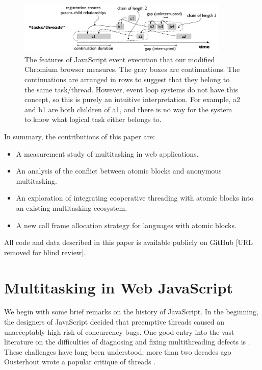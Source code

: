 \documentclass[acmsmall,anonymous,review]{acmart}\settopmatter{printfolios=true,printccs=false,printacmref=false}
\begin{document}
\begin{figure}
\includegraphics[width=0.9\textwidth]{Figures/continuation_tree}
\caption{The features of JavaScript event execution that our modified Chromium browser measures.
  The gray boxes are continuations.
  The continuations are arranged in rows to suggest that they belong to the same task/thread.
  However, event loop systems do not have this concept, so this is purely an intuitive interpretation.
  For example, a2 and b1 are both children of a1, and there is no way for the system to know what logical task either belongs to.}
\label{fig:continuation_tree}
\end{figure}

In summary, the contributions of this paper are:
\begin{itemize}
\item A measurement study of multitasking in web applications.
\item An analysis of the conflict between atomic blocks and anonymous multitasking.
\item An exploration of integrating cooperative threading with atomic blocks into an existing multitasking ecosystem.
\item A new call frame allocation strategy for languages with atomic blocks.
\end{itemize}

All code and data described in this paper is available publicly on GitHub [URL removed for blind review].

\section{Multitasking in Web JavaScript}

We begin with some brief remarks on the history of JavaScript.
In the beginning, the designers of JavaScript decided that preemptive threads caused an unacceptably high risk of concurrency bugs.
One good entry into the vast literature on the difficulties of diagnosing and fixing multithreading defects is \cite{Lu2008}.
These challenges have long been understood; more than two decades ago Ousterhout wrote a popular critique of threads \cite{Ousterhout1996}.
\end{document}
